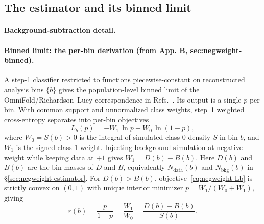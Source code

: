 \subsection{The estimator and its binned limit}\label{recsec:negweight-estimator}

\paragraph{Background-subtraction detail.}

\paragraph{Binned limit: the per-bin derivation (from App. B, sec:negweight-binned).} A step-1 classifier restricted to functions piecewise-constant on reconstructed analysis bins $\{b\}$ gives the population-level binned limit of the OmniFold/Richardson--Lucy correspondence in Refs.~\cite{Andreassen:2019cjw,Andreassen:2021zzk}. Its output is a single $p$ per bin. With common support and unnormalized class weights, step~1 weighted cross-entropy separates into per-bin objectives
\begin{equation}
  \label{eq:negweight-Lb}
  L_b(p) = -W_1\,\ln p - W_0\,\ln(1-p),
\end{equation}
where $W_0=S(b)>0$ is the integral of simulated class-0 density $S$ in bin $b$, and $W_1$ is the signed class-1 weight. Injecting background simulation at negative weight while keeping data at $+1$ gives $W_1=D(b)-B(b)$. Here $D(b)$ and $B(b)$ are the bin masses of $D$ and $B$, equivalently $N_{\mathrm{data}}(b)$ and $N_{\mathrm{bkg}}(b)$ in \S\ref{sec:negweight-estimator}. For $D(b)>B(b)$, objective~\eqref{eq:negweight-Lb} is strictly convex on $(0,1)$ with unique interior minimizer $p=W_1/(W_0+W_1)$, giving
\begin{equation}
  r(b) = \frac{p}{1-p} = \frac{W_1}{W_0} = \frac{D(b)-B(b)}{S(b)}.
\end{equation}

